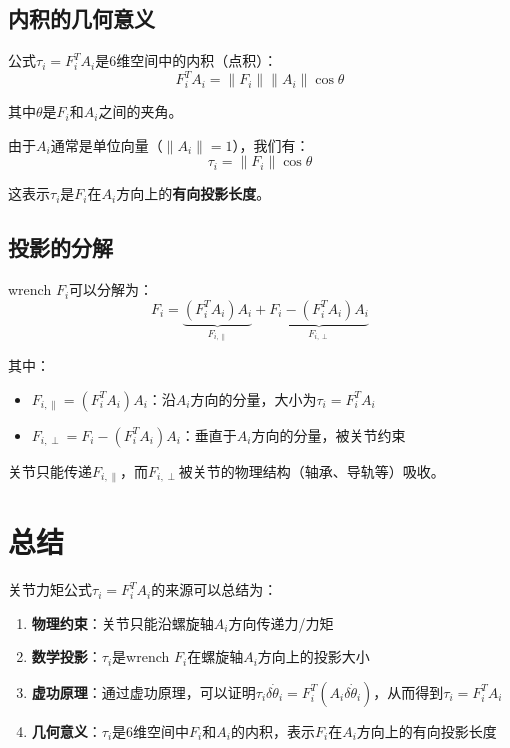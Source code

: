 \documentclass[12pt,a4paper]{article}
\begin{document}
\subsection{内积的几何意义}

公式$\tau_i = F_i^T A_i$是6维空间中的内积（点积）：
\begin{equation}
F_i^T A_i = \|F_i\| \|A_i\| \cos \theta
\end{equation}

其中$\theta$是$F_i$和$A_i$之间的夹角。

由于$A_i$通常是单位向量（$\|A_i\| = 1$），我们有：
\begin{equation}
\tau_i = \|F_i\| \cos \theta
\end{equation}

这表示$\tau_i$是$F_i$在$A_i$方向上的\textbf{有向投影长度}。

\subsection{投影的分解}

wrench $F_i$可以分解为：
\begin{equation}
F_i = \underbrace{(F_i^T A_i) A_i}_{F_{i,\parallel}} + \underbrace{F_i - (F_i^T A_i) A_i}_{F_{i,\perp}}
\end{equation}

其中：
\begin{itemize}
\item $F_{i,\parallel} = (F_i^T A_i) A_i$：沿$A_i$方向的分量，大小为$\tau_i = F_i^T A_i$
\item $F_{i,\perp} = F_i - (F_i^T A_i) A_i$：垂直于$A_i$方向的分量，被关节约束
\end{itemize}

关节只能传递$F_{i,\parallel}$，而$F_{i,\perp}$被关节的物理结构（轴承、导轨等）吸收。

\section{总结}

关节力矩公式$\tau_i = F_i^T A_i$的来源可以总结为：

\begin{enumerate}
\item \textbf{物理约束}：关节只能沿螺旋轴$A_i$方向传递力/力矩

\item \textbf{数学投影}：$\tau_i$是wrench $F_i$在螺旋轴$A_i$方向上的投影大小

\item \textbf{虚功原理}：通过虚功原理，可以证明$\tau_i \delta \dot{\theta}_i = F_i^T (A_i \delta \dot{\theta}_i)$，从而得到$\tau_i = F_i^T A_i$

\item \textbf{几何意义}：$\tau_i$是6维空间中$F_i$和$A_i$的内积，表示$F_i$在$A_i$方向上的有向投影长度
\end{enumerate}
\end{document}
